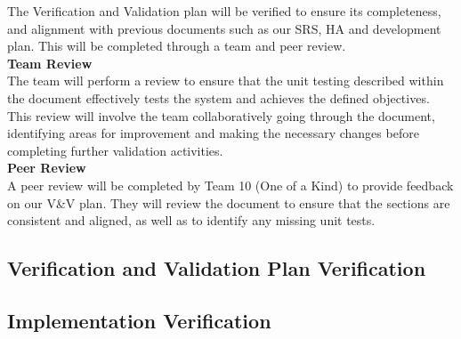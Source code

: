 \documentclass[12pt, titlepage]{article}
\begin{document}
The Verification and Validation plan will be verified to ensure its completeness, and alignment with previous 
documents such as our SRS, HA and development plan. This will be completed through a team and peer review. \\

\textbf{Team Review}\\
The team will perform a review to ensure that the unit testing described within the document effectively tests the system and achieves the defined objectives. 
This review will involve the team collaboratively going through the document, identifying areas for improvement and making the necessary changes before completing further validation activities.\\

\textbf{Peer Review}\\
A peer review will be completed by Team 10 (One of a Kind) to provide feedback on our V\&V plan. They will review the document to ensure that the sections are consistent and aligned, as well as to identify any missing unit tests.

\subsection{Verification and Validation Plan Verification}




\subsection{Implementation Verification}



\end{document}
